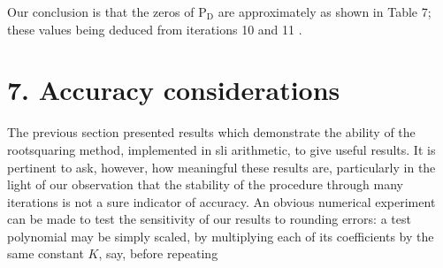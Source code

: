 \documentclass[10pt]{article}
\begin{document}
Our conclusion is that the zeros of $\mathrm{P}_{\mathrm{D}}$ are approximately as shown in Table 7; these values being deduced from iterations 10 and 11 .

\section*{7. Accuracy considerations}
The previous section presented results which demonstrate the ability of the rootsquaring method, implemented in sli arithmetic, to give useful results. It is pertinent to ask, however, how meaningful these results are, particularly in the light of our observation that the stability of the procedure through many iterations is not a sure indicator of accuracy. An obvious numerical experiment can be made to test the sensitivity of our results to rounding errors: a test polynomial may be simply scaled, by multiplying each of its coefficients by the same constant $K$, say, before repeating
\end{document}
